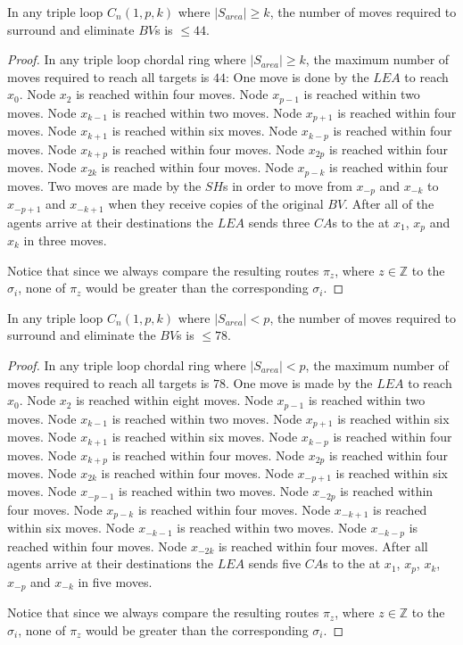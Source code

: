  
 \begin{theorem}
In any triple loop   $C_n(1,p,k)$ where $\left\vert{S_{area}}\right\vert \ge k$, the number of moves required to surround and eliminate $BV$s is $\leq44$.
\end{theorem}
 \begin{proof}
In any triple loop chordal ring where $\left\vert{S_{area}}\right\vert \ge k$, the maximum number of moves required to reach all targets is $44$: One move is done by the $LEA$ to reach $x_0$. Node $x_{2}$ is reached within four moves.
 Node $x_{p-1}$ is reached within two moves.
 Node $x_{k-1}$ is reached within two moves.
 Node $x_{p+1}$ is reached within four moves.
 Node $x_{k+1}$ is reached within six moves.
 Node $x_{k-p}$ is reached within four moves.
  Node $x_{k+p}$ is reached within four moves.
 Node $x_{2p}$ is reached within four moves.
 Node $x_{2k}$ is reached within four moves.
 Node $x_{p-k}$ is reached within four moves.
 Two moves are made by the $SH$s in order to move from $x_{-p}$ and $x_{-k}$ to $x_{-p+1}$ and $x_{-k+1}$  when they receive copies of the original $BV$.
 After all of the agents arrive at their destinations the $LEA$ sends three $CA$s to the \bvs at $x_{1}$, $x_{p}$ and $x_{k}$ in three moves.

Notice that since we always compare the resulting routes $\pi_z$, where $z \in \mathbb{Z}$  to the  $\sigma_i$, none of $\pi_z$ would be greater than the corresponding $\sigma_i$. 
\end{proof}

\begin{theorem}
In any triple loop   $C_n(1,p,k)$ where $\left\vert{S_{area}}\right\vert < p$, the number of moves required to surround and eliminate the $BV$s is $\leq78$.
\end{theorem}
 \begin{proof}
In any triple loop chordal ring where $\left\vert{S_{area}}\right\vert <p$, the maximum number of moves required to reach all targets is $78$. One move is made by the $LEA$ to reach $x_0$.
 Node $x_{2}$ is reached within eight moves.
 Node $x_{p-1}$ is reached within two moves.
 Node $x_{k-1}$ is reached within two moves.
 Node $x_{p+1}$ is reached  within six moves.
 Node $x_{k+1}$ is reached within six moves.
 Node $x_{k-p}$ is reached within four moves.
 Node $x_{k+p}$ is reached within four moves.
 Node $x_{2p}$ is reached within four moves.
 Node $x_{2k}$ is reached within four moves.
 Node $x_{-p+1}$ is reached within six moves.
 Node $x_{-p-1}$ is reached within two moves.
 Node $x_{-2p}$ is reached within four moves.
 Node $x_{p-k}$ is reached  within four moves.
 Node $x_{-k+1}$ is reached within six moves.
 Node $x_{-k-1}$ is reached within two moves.
 Node $x_{-k-p}$ is reached within four moves.
 Node $x_{-2k}$ is reached within four moves.
 After all agents arrive at their destinations the $LEA$ sends five $CA$s to the \bvs at $x_{1}$, $x_{p}$, $x_{k}$,$x_{-p}$ and $x_{-k}$ in five moves.

Notice that since we always compare the resulting routes $\pi_z$, where $z \in \mathbb{Z}$  to the  $\sigma_i$, none of $\pi_z$ would be greater than the corresponding $\sigma_i$. 
\end{proof}



